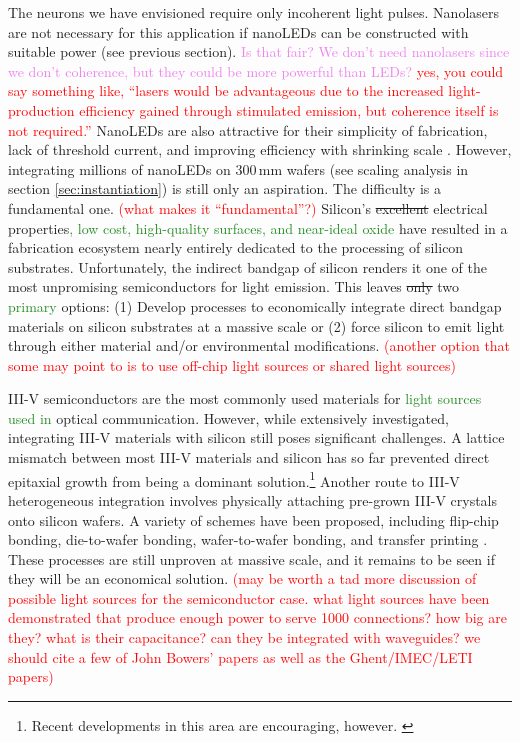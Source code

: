 \documentclass[twocolumn]{article}
\begin{document}
The neurons we have envisioned require only incoherent light pulses. Nanolasers are not necessary for this application if nanoLEDs can be constructed with suitable power (see previous section). \textcolor{Violet}{Is that fair? We don't need nanolasers since we don't coherence, but they could be more powerful than LEDs?} \textcolor{red}{yes, you could say something like, ``lasers would be advantageous due to the increased light-production efficiency gained through stimulated emission, but coherence itself is not required.''} NanoLEDs are also attractive for their simplicity of fabrication, lack of threshold current, and improving efficiency with shrinking scale \cite{romeira2019physical}. However, integrating millions of nanoLEDs on 300\,mm wafers (see scaling analysis in section \ref{sec:instantiation}) is still only an aspiration. The difficulty is a fundamental one. \textcolor{red}{(what makes it ``fundamental''?)} Silicon's \sout{excellent} electrical properties\textcolor{ForestGreen}{, low cost, high-quality surfaces, and near-ideal oxide} have resulted in a fabrication ecosystem nearly entirely dedicated to the processing of silicon substrates. Unfortunately, the indirect bandgap of silicon renders it one of the most unpromising semiconductors for light emission. This leaves \sout{only} two \textcolor{ForestGreen}{primary} options: (1) Develop processes to economically integrate direct bandgap materials on silicon substrates at a massive scale or (2) force silicon to emit light through either material and/or environmental modifications. \textcolor{red}{(another option that some may point to is to use off-chip light sources or shared light sources) }

III-V semiconductors are the most commonly used materials for \textcolor{ForestGreen}{light sources used in} optical communication. However, while extensively investigated, integrating III-V materials with silicon still poses significant challenges. A lattice mismatch between most III-V materials and silicon has so far prevented direct epitaxial growth from being a dominant solution.\footnote{Recent developments in this area are encouraging, however. \cite{li2017epitaxial}} Another route to III-V heterogeneous integration involves physically attaching pre-grown III-V crystals onto silicon wafers. A variety of schemes have been proposed, including flip-chip bonding, die-to-wafer bonding, wafer-to-wafer bonding, and transfer printing \cite{zhang2019iii,more,references,jeff,has,a,bunch}. These processes are still unproven at massive scale, and it remains to be seen if they will be an economical solution. \textcolor{red}{(may be worth a tad more discussion of possible light sources for the semiconductor case. what light sources have been demonstrated that produce enough power to serve 1000 connections? how big are they? what is their capacitance? can they be integrated with waveguides? we should cite a few of John Bowers' papers as well as the Ghent/IMEC/LETI papers)}
\end{document}

